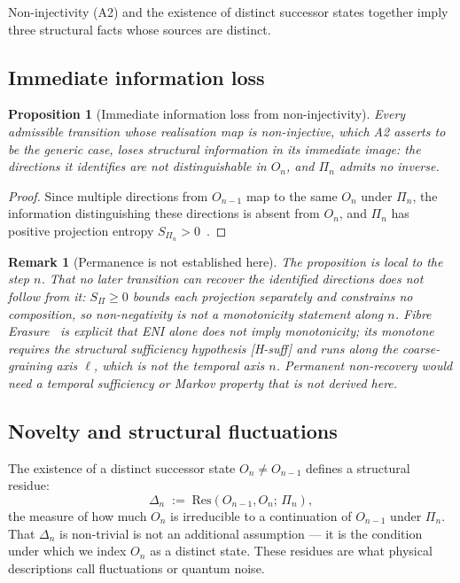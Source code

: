\documentclass[11pt,a4paper]{article}
\newtheorem{proposition}[theorem]{Proposition}
\newtheorem{remark}[theorem]{Remark}
\begin{document}
  Non-injectivity (A2) and the existence of distinct successor states together
  imply three structural facts whose sources are distinct.

  \subsection{Immediate information loss}

    \begin{proposition}[Immediate information loss from non-injectivity]
      \label{prop:irreversibility}
      Every admissible transition whose realisation map is non-injective, which A2 asserts
      to be the generic case, loses structural information in its immediate image: the
      directions it identifies are not distinguishable in $O_n$, and $\Pi_n$ admits no
      inverse.
    \end{proposition}

    \begin{proof}
      Since multiple directions from $O_{n-1}$ map to the same $O_n$ under
      $\Pi_n$, the information distinguishing these directions is absent from
      $O_n$, and $\Pi_n$ has positive projection entropy
      $S_{\Pi_n} > 0$~\cite{Beau2026l}.
    \end{proof}

    \begin{remark}[Permanence is not established here]
      \label{rem:no-permanence}
      The proposition is local to the step $n$.
      That no later transition can recover the identified directions does not follow from it:
      $S_\Pi \geq 0$ bounds each projection separately and constrains no composition, so
      non-negativity is not a monotonicity statement along $n$.
      Fibre Erasure~\cite{Beau2026fe} is explicit that ENI alone does not imply monotonicity;
      its monotone requires the structural sufficiency hypothesis \textup{[H-suff]} and runs
      along the coarse-graining axis $\ell$, which is not the temporal axis $n$.
      Permanent non-recovery would need a temporal sufficiency or Markov property that is not
      derived here.
    \end{remark}

  \subsection{Novelty and structural fluctuations}
    \label{subsec:ni-novelty}

    The existence of a distinct successor state $O_n \neq O_{n-1}$ defines a
    structural residue:
    \begin{equation}
      \label{eq:delta-n}
      \Delta_n \;:=\; \mathrm{Res}(O_{n-1}, O_n;\, \Pi_n),
    \end{equation}
    the measure of how much $O_n$ is irreducible to a continuation of $O_{n-1}$
    under $\Pi_n$.
    That $\Delta_n$ is non-trivial is not an additional assumption — it is the
    condition under which we index $O_n$ as a distinct state.
    These residues are what physical descriptions call fluctuations or quantum noise.
\end{document}
